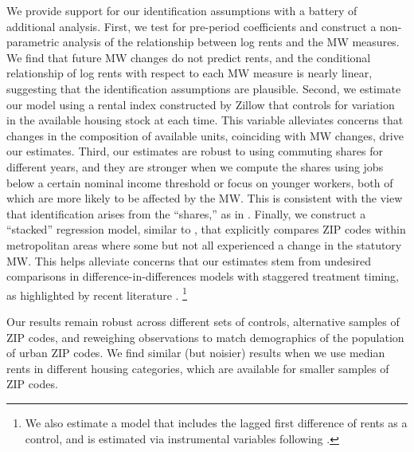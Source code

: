 We provide support for our identification assumptions with a battery of 
additional analysis.
First, we test for pre-period coefficients and construct a non-parametric 
analysis of the relationship between log rents and the MW measures.
We find that future MW changes do not predict rents, and the conditional
relationship of log rents with respect to each MW measure is nearly linear,
suggesting that the identification assumptions are plausible.
Second, we estimate our model using a rental index constructed by Zillow that 
controls for variation in the available housing stock at each time.
This variable alleviates concerns that changes in the composition of available 
units, coinciding with MW changes, drive our estimates.
Third, our estimates are robust to using commuting shares for different
years, and they are stronger when we compute the shares using jobs below a 
certain nominal income threshold or focus on younger workers, both of which are 
more likely to be affected by the MW.
This is consistent with the view that identification arises from the ``shares,''
as in \textcite{GoldsmithpinkhamEtAl2020}.
Finally, we construct a ``stacked'' regression model, similar to 
\textcite{CegnizEtAl2019}, that explicitly compares ZIP codes within 
metropolitan areas where some but not all experienced a change in the 
statutory MW.
This helps alleviate concerns that our estimates stem from undesired 
comparisons in difference-in-differences models with staggered treatment 
timing, as highlighted by recent literature 
\parencite{deChaisemartinEtAl2022,RothEtAl2022}.%
\footnote{We also estimate a model that includes the lagged first difference 
	of rents as a control, and is estimated via instrumental variables following 
    \textcite{ArellanoBond1991}.}

Our results remain robust across different sets of controls,
alternative samples of ZIP codes, and reweighing observations to match 
demographics of the population of urban ZIP codes.
We find similar (but noisier) results when we use median rents in 
different housing categories, which are available for smaller samples of 
ZIP codes.


